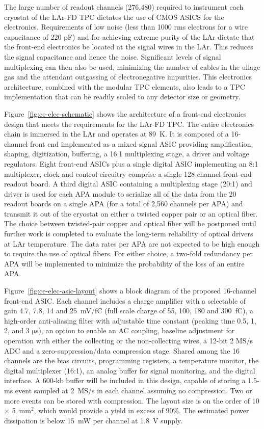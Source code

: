The large number of readout channels (276,480) required to instrument
each cryostat of the LAr-FD TPC dictates the use of CMOS ASICS for the electronics. 
Requirements of low noise (less than 1000 rms electrons for a wire
capacitance of 220 pF) and for achieving extreme purity of the LAr dictate that
the front-end electronics be located at the signal wires in the LAr.  This
reduces the signal capacitance and hence the noise. Significant levels of 
signal multiplexing can then also be used, minimizing the number of cables
in the ullage gas and the attendant 
outgassing of electronegative impurities.
This electronics
architecture, combined with the modular TPC elements, also leads to a
TPC implementation that can be readily scaled to any detector size or
geometry.

Figure~\ref{fig:ce-elec-schematic} shows the architecture of a front-end electronics
design that meets the requirements for the LAr-FD TPC.
The entire electronics chain is immersed in the LAr and operates at 89~K.
It is composed of a 16-channel front end implemented as a
mixed-signal ASIC providing amplification, shaping, digitization,
buffering, a 16:1 multiplexing stage, a driver and voltage regulators.
Eight front-end ASICs plus a single digital ASIC implementing an
8:1 multiplexer, clock and control circuitry comprise a 
single 128-channel front-end readout board.  A third digital ASIC containing a
multiplexing stage (20:1) and driver is used for each APA module to serialize all of the data
from the 20 readout boards on a single APA (for a total of 2,560 channels per APA) and
transmit it out of the cryostat on either a twisted copper pair or an
optical fiber. The choice between twisted-pair copper and optical fiber will be
postponed until further work is completed to evaluate the long-term reliability
of optical drivers at LAr temperature. The data rates per APA
are not expected to be high enough to require the use of optical fibers.
For either choice, a two-fold redundancy per APA will be implemented
to minimize the probability of the loss of an entire APA.


Figure~\ref{fig:ce-elec-asic-layout} shows a block diagram of the proposed 16-channel front-end
ASIC. Each channel includes a charge amplifier with a selectable of
gain 4.7, 7.8, 14 and 25~mV/fC (full scale charge of 55, 100, 180 and
300~fC), a high-order anti-aliasing filter with adjustable time
constant (peaking time 0.5, 1, 2, and 3 $\mathrm{\mu}$s), an option to enable an AC
coupling, baseline adjustment for operation with either the collecting
or the non-collecting wires, a 12-bit 2 MS/s ADC and a zero-suppression/data
compression stage. Shared among the 16 channels are the bias circuits,
programming registers, a temperature monitor, the digital multiplexer (16:1), an
analog buffer for signal monitoring, and the digital interface. A 600-kb 
buffer will be included in this design, capable of storing a 1.5-ms 
event sampled at 2~MS/s in each channel assuming no compression. Two or
more events can be stored with compression. The layout size is on the
order of 10 $\times$ 5~mm${^2}$, which would provide a
yield in excess of 90\%. The estimated power dissipation is below 15~mW
per channel at 1.8~V supply.

